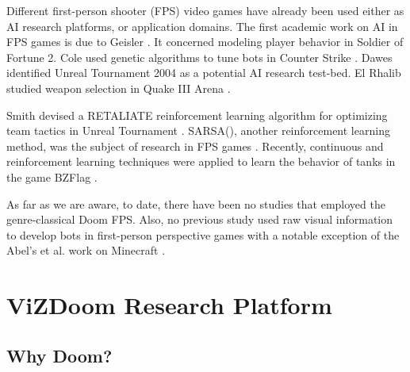 \documentclass[english,american,conference, balance]{IEEEtran}
\begin{document}
\begin{comment}
First-person shorter games
\end{comment}
Different first-person shooter (FPS) video games have already been
used either as AI research platforms, or application domains. The
first academic work on AI in FPS games is due to Geisler \cite{geisler2002empirical}.
It concerned modeling player behavior in Soldier of Fortune 2. Cole
used genetic algorithms to tune bots in Counter Strike \cite{cole2004using}.
Dawes \cite{dawes2005towards} identified Unreal Tournament 2004 as
a potential AI research test-bed. El Rhalib studied weapon selection
in Quake III Arena \cite{el2007hybrid}. \begin{comment}
Reinforcement learning in FPS
\end{comment}
Smith devised a RETALIATE reinforcement learning algorithm for optimizing
team tactics in Unreal Tournament \cite{smith2007retaliate}. SARSA(),
another reinforcement learning method, was the subject of research
in FPS games \cite{5672586,6314567}. Recently, continuous and reinforcement
learning techniques were applied to learn the behavior of tanks in
the game BZFlag \cite{smith2014continuous}.

As far as we are aware, to date, there have been no studies that employed
the genre-classical Doom FPS. Also, no previous study used raw visual
information to develop bots in first-person perspective games with
a notable exception of the Abel's et al. work on Minecraft \cite{DBLP:journals/corr/AbelADKS16}.


\section{ViZDoom Research Platform\label{sec:Platform}}

\subsection{Why Doom?}
\end{document}
